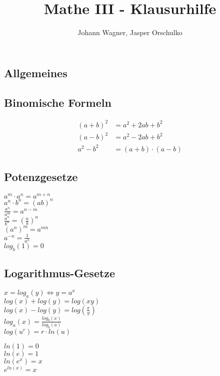 \documentclass[a4paper, 10pt, landscape]{article}
\author{Johann Wagner, Jasper Orschulko}
\title{Mathe III - Klausurhilfe}
\begin{document}
    \begin{multicols}{5}   
	\begin{small}
	\section{Allgemeines}
		\subsection{Binomische Formeln}
			\begin{align*}
				(a+b)^{2} &= a^{2}+2ab+b^{2}\\
			    (a-b)^{2} &= a^{2}-2ab+b^{2}\\
			    a^{2}-b^{2} &= (a+b)\cdot(a-b)
			\end{align*}
		\subsection{Potenzgesetze}
			\begin{multicols}{2}
	            $a^m \cdot a^n = a^{m+n}$\\
	            $a^n \cdot b^n = (ab)^n$\\
	            $\frac{a^n}{a^m} = a^{n-m}$\\
	            $\frac{a^n}{b^n} = \left(\frac{a}{b}\right)^n$\\
	            $(a^n)^m = a^{mn}$\\
	            $a^{-n} = \frac{1}{a^n}$\\
	            $log_b(1) = 0$
            \end{multicols}
         \subsection{Logarithmus-Gesetze}
		     \noindent
	         $x = log_a(y) \Leftrightarrow y = a^x$\\
	         $log(x) + log(y) = log(xy)$\\
	         $log(x) - log(y) = log(\frac{x}{y})$\\
	         $log_a(x) = \frac{log_b(x)}{log_b(a)}$  \\
	         $log(u^r) = r \cdot ln(u)$
	         \begin{multicols}{2}
		         \noindent
		         $ln(1) = 0$ \\
		         $ln(e) = 1$ \\
		         $ln(e^x) = x$ \\
		         $e^{ln(x)} = x$
	         \end{multicols}

\end{small}
\end{multicols}
\end{document}
